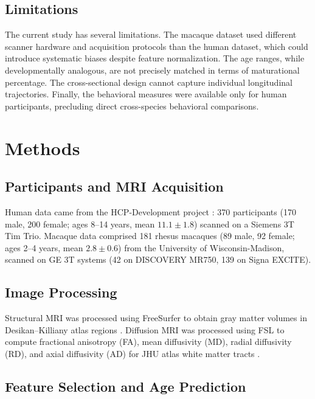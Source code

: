 \documentclass[11pt]{article}
\begin{document}
\subsection{Limitations}

The current study has several limitations. The macaque dataset used different scanner hardware and acquisition protocols than the human dataset, which could introduce systematic biases despite feature normalization. The age ranges, while developmentally analogous, are not precisely matched in terms of maturational percentage. The cross-sectional design cannot capture individual longitudinal trajectories. Finally, the behavioral measures were available only for human participants, precluding direct cross-species behavioral comparisons.

\section{Methods}

\subsection{Participants and MRI Acquisition}

Human data came from the HCP-Development project \citep{somerville2018lifespan}: 370 participants (170 male, 200 female; ages 8--14 years, mean $11.1 \pm 1.8$) scanned on a Siemens 3T Tim Trio. Macaque data comprised 181 rhesus macaques (89 male, 92 female; ages 2--4 years, mean $2.8 \pm 0.6$) from the University of Wisconsin-Madison, scanned on GE 3T systems (42 on DISCOVERY MR750, 139 on Signa EXCITE).

\subsection{Image Processing}

Structural MRI was processed using FreeSurfer \citep{fischl2012freesurfer} to obtain gray matter volumes in Desikan--Killiany atlas regions \citep{desikan2006automated}. Diffusion MRI was processed using FSL \citep{jenkinson2012fsl} to compute fractional anisotropy (FA), mean diffusivity (MD), radial diffusivity (RD), and axial diffusivity (AD) for JHU atlas white matter tracts \citep{mori2005mri}.

\subsection{Feature Selection and Age Prediction}
\end{document}
